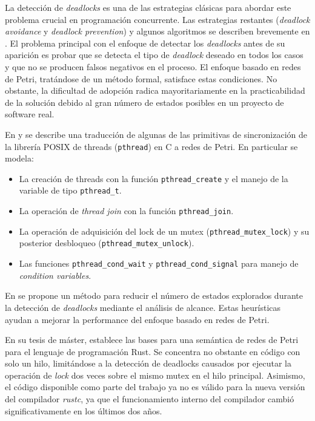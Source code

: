\documentclass[12pt]{article}
\begin{document}
La detección de \textit{deadlocks} es una de las estrategias clásicas para abordar este problema crucial en programación concurrente.
Las estrategias restantes (\textit{deadlock avoidance} y \textit{deadlock prevention}) y algunos algoritmos se describen brevemente en \cite{singhal1989}.
El problema principal con el enfoque de detectar los \textit{deadlocks} antes de su aparición es probar que
se detecta el tipo de \textit{deadlock} deseado en todos los casos y que no se producen falsos negativos en el proceso.
El enfoque basado en redes de Petri, tratándose de un método formal, satisface estas condiciones.
No obstante, la dificultad de adopción radica mayoritariamente en la practicabilidad de la solución debido al gran número de estados posibles en un proyecto de software real.

En \cite{kavi-moshtaghi2002} y \cite{moshtaghi2001} se describe una traducción de algunas de las primitivas
de sincronización de la librería POSIX de threads (\texttt{pthread}) en C a redes de Petri.
En particular se modela:

\begin{itemize}
    \item La creación de threads con la función \texttt{pthread\_create} y el manejo de la variable de tipo \texttt{pthread\_t}.
    \item La operación de \textit{thread join} con la función \texttt{pthread\_join}.
    \item La operación de adquisición del lock de un mutex (\texttt{pthread\_mutex\_lock}) y su posterior desbloqueo (\texttt{pthread\_mutex\_unlock}).
    \item Las funciones \texttt{pthread\_cond\_wait} y \texttt{pthread\_cond\_signal} para manejo de \textit{condition variables}.
\end{itemize}

En \cite{karatkevich-grobelna2014} se propone un método para reducir el número de estados explorados
durante la detección de \textit{deadlocks} mediante el análisis de alcance.
Estas heurísticas ayudan a mejorar la performance del enfoque basado en redes de Petri.

En su tesis de máster, \cite{meyer2020} establece las bases para una semántica de redes de Petri para el lenguaje de programación Rust.
Se concentra no obstante en código con solo un hilo, limitándose a la detección de deadlocks causados
por ejecutar la operación de \textit{lock} dos veces sobre el mismo mutex en el hilo principal.
Asimismo, el código disponible como parte del trabajo ya no es válido para la nueva versión del compilador \textit{rustc},
ya que el funcionamiento interno del compilador cambió significativamente en los últimos dos años.
\end{document}

